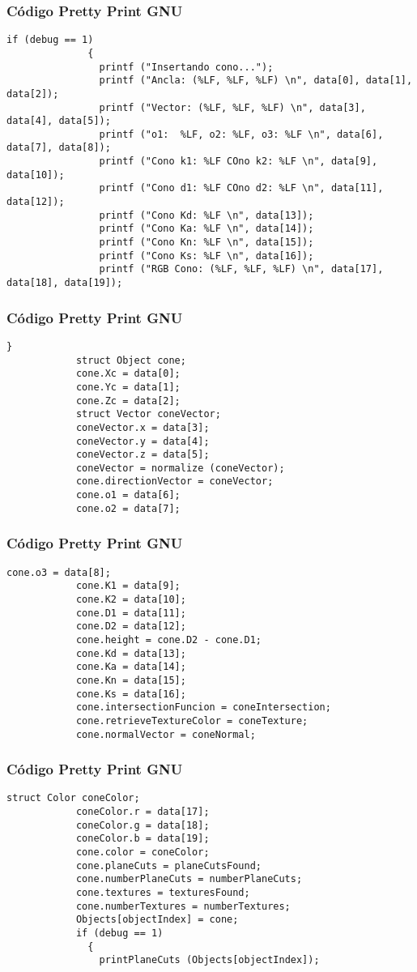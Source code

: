 \documentclass{beamer}
\begin{document}
\begin{frame}[fragile]
\frametitle{C\'odigo Pretty Print GNU}
\begin{lstlisting}[style=CStyle]
            if (debug == 1)
              {
                printf ("Insertando cono...");
                printf ("Ancla: (%LF, %LF, %LF) \n", data[0], data[1], data[2]);
                printf ("Vector: (%LF, %LF, %LF) \n", data[3], data[4], data[5]);
                printf ("o1:  %LF, o2: %LF, o3: %LF \n", data[6], data[7], data[8]);
                printf ("Cono k1: %LF COno k2: %LF \n", data[9], data[10]);
                printf ("Cono d1: %LF COno d2: %LF \n", data[11], data[12]);
                printf ("Cono Kd: %LF \n", data[13]);
                printf ("Cono Ka: %LF \n", data[14]);
                printf ("Cono Kn: %LF \n", data[15]);
                printf ("Cono Ks: %LF \n", data[16]);
                printf ("RGB Cono: (%LF, %LF, %LF) \n", data[17], data[18], data[19]);
\end{lstlisting}
\end{frame}
\begin{frame}[fragile]
\frametitle{C\'odigo Pretty Print GNU}
\begin{lstlisting}[style=CStyle]
              }
            struct Object cone;
            cone.Xc = data[0];
            cone.Yc = data[1];
            cone.Zc = data[2];
            struct Vector coneVector;
            coneVector.x = data[3];
            coneVector.y = data[4];
            coneVector.z = data[5];
            coneVector = normalize (coneVector);
            cone.directionVector = coneVector;
            cone.o1 = data[6];
            cone.o2 = data[7];
\end{lstlisting}
\end{frame}
\begin{frame}[fragile]
\frametitle{C\'odigo Pretty Print GNU}
\begin{lstlisting}[style=CStyle]
            cone.o3 = data[8];
            cone.K1 = data[9];
            cone.K2 = data[10];
            cone.D1 = data[11];
            cone.D2 = data[12];
            cone.height = cone.D2 - cone.D1;
            cone.Kd = data[13];
            cone.Ka = data[14];
            cone.Kn = data[15];
            cone.Ks = data[16];
            cone.intersectionFuncion = coneIntersection;
            cone.retrieveTextureColor = coneTexture;
            cone.normalVector = coneNormal;
\end{lstlisting}
\end{frame}
\begin{frame}[fragile]
\frametitle{C\'odigo Pretty Print GNU}
\begin{lstlisting}[style=CStyle]
            struct Color coneColor;
            coneColor.r = data[17];
            coneColor.g = data[18];
            coneColor.b = data[19];
            cone.color = coneColor;
            cone.planeCuts = planeCutsFound;
            cone.numberPlaneCuts = numberPlaneCuts;
            cone.textures = texturesFound;
            cone.numberTextures = numberTextures;
            Objects[objectIndex] = cone;
            if (debug == 1)
              {
                printPlaneCuts (Objects[objectIndex]);
\end{lstlisting}
\end{frame}
\end{document}
